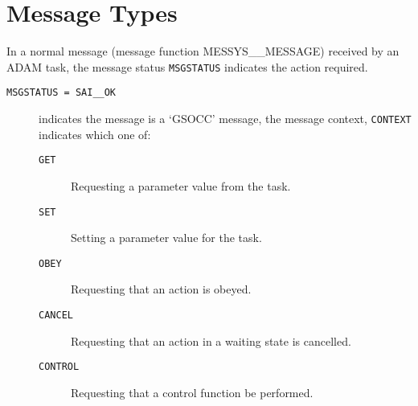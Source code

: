 \documentclass[twoside,11pt,nolof]{starlink}
\begin{document}
\section{Message Types}
In a normal message (message function MESSYS\_\_MESSAGE) received by an ADAM
task, the message status \texttt{MSGSTATUS} indicates the action required.
\begin{description}
\item[\texttt{MSGSTATUS = SAI\_\_OK}] indicates the message is a `GSOCC'
message, the message context, \texttt{CONTEXT} indicates which one of:
\begin{description}
\item[\texttt{GET}]      Requesting a parameter value from the task.
\item[\texttt{SET}]      Setting a parameter value for the task.
\item[\texttt{OBEY}]     Requesting that an action is obeyed.
\item[\texttt{CANCEL}]   Requesting that an action in a waiting state is
cancelled.
\item[\texttt{CONTROL}]  Requesting that a control function be performed.


\end{description}
\end{description}
\end{document}
